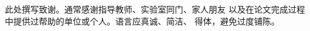 \begin{ack}
\hspace{2em}此处撰写致谢。通常感谢指导教师、实验室同门、家人朋友
以及在论文完成过程中提供过帮助的单位或个人。语言应真诚、简洁、
得体，避免过度铺陈。
\end{ack}

